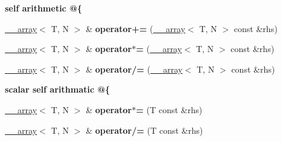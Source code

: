 \begin{Indent}{\bf self arithmetic @\{}\par
{\em \label{_amgrpee29a0132b6b71a7962958404c3728ec}
 }\begin{DoxyCompactItemize}
\item 
\hypertarget{class____array_a1fdacdb2b2a79effe9a11121648a3f44}{
\hyperlink{class____array}{\_\-\_\-array}$<$ T, N $>$ \& {\bfseries operator+=} (\hyperlink{class____array}{\_\-\_\-array}$<$ T, N $>$ const \&rhs)}
\label{class____array_a1fdacdb2b2a79effe9a11121648a3f44}

\item 
\hypertarget{class____array_a5b698b219ec8e62bab83528564caa579}{
\hyperlink{class____array}{\_\-\_\-array}$<$ T, N $>$ \& {\bfseries operator$\ast$=} (\hyperlink{class____array}{\_\-\_\-array}$<$ T, N $>$ const \&rhs)}
\label{class____array_a5b698b219ec8e62bab83528564caa579}

\item 
\hypertarget{class____array_af812f20cd83b4f54cb4b0e780ed07b11}{
\hyperlink{class____array}{\_\-\_\-array}$<$ T, N $>$ \& {\bfseries operator/=} (\hyperlink{class____array}{\_\-\_\-array}$<$ T, N $>$ const \&rhs)}
\label{class____array_af812f20cd83b4f54cb4b0e780ed07b11}

\end{DoxyCompactItemize}
\end{Indent}
\begin{Indent}{\bf scalar self arithmatic @\{}\par
{\em \label{_amgrp7095cbd4de7cb27ceb837c23324bbb90}
 }\begin{DoxyCompactItemize}
\item 
\hypertarget{class____array_abf242f49019b906d3f846fc185cc38ae}{
\hyperlink{class____array}{\_\-\_\-array}$<$ T, N $>$ \& {\bfseries operator$\ast$=} (T const \&rhs)}
\label{class____array_abf242f49019b906d3f846fc185cc38ae}

\item 
\hypertarget{class____array_ad0a349749a91dc7379c626dc13b6f26c}{
\hyperlink{class____array}{\_\-\_\-array}$<$ T, N $>$ \& {\bfseries operator/=} (T const \&rhs)}
\label{class____array_ad0a349749a91dc7379c626dc13b6f26c}

\end{DoxyCompactItemize}
\end{Indent}
